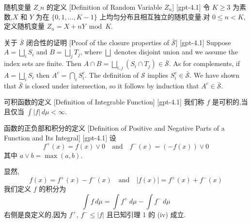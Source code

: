 \documentclass[UTF8]{ctexart}
\begin{document}
    
    
    \begin{dfn}
        {随机变量 $Z\_n$ 的定义}
        [Definition of Random Variable $Z_n$]
        [gpt-4.1]
        令 $K \geq 3$ 为素数,$X$ 和 $Y$ 为在 $\{0, 1, \ldots, K-1\}$ 上均匀分布且相互独立的随机变量.对 $0 \leq n < K$,定义随机变量 $Z_{n} = X + n Y \bmod K$.
    \end{dfn}
    
    
    
    \begin{prf}
        {关于 $\bar{\mathcal{S}}$ 闭合性的证明}
        [Proof of the closure properties of $\bar{\mathcal{S}}$]
        [gpt-4.1]
        Suppose $A = \bigsqcup_{i} S_i$ and $B = \bigsqcup_{j} T_j$, where $\bigsqcup$ denotes disjoint union and we assume the index sets are finite.
Then $A \cap B = \bigsqcup_{i, j} (S_i \cap T_j) \in \bar{\mathcal{S}}$.
As for complements, if $A = \bigsqcup_{i} S_i$ then $A^c = \bigcap_{i} S_i^c$.
The definition of $\mathcal{S}$ implies $S_i^c \in \bar{\mathcal{S}}$.
We have shown that $\bar{\mathcal{S}}$ is closed under intersection, so it follows by induction that $A^c \in \bar{\mathcal{S}}$.
    \end{prf}
    
    
    
    \begin{dfn}
        {可积函数的定义}
        [Definition of Integrable Function]
        [gpt-4.1]
        我们称 $f$ 是可积的,当且仅当 $\int |f| \, d\mu < \infty$.
    \end{dfn}
    
    
    
    \begin{dfn}
        {函数的正负部和积分的定义}
        [Definition of Positive and Negative Parts of a Function and Its Integral]
        [gpt-4.1]
        设
\[
f^+(x) = f(x) \vee 0 \quad \text{and} \quad f^-(x) = (-f(x)) \vee 0
\]
其中 $a \vee b = \max(a, b)$.

显然,
\[
f(x) = f^+(x) - f^-(x) \quad \text{and} \quad |f(x)| = f^+(x) + f^-(x)
\]
我们定义 $f$ 的积分为
\[
\int f \, d\mu = \int f^+ \, d\mu - \int f^- \, d\mu
\]
右侧是良定义的,因为 $f^+$, $f^- \leq |f|$ 且已知引理 1 的 (iv) 成立.
    \end{dfn}
    
\end{document}
